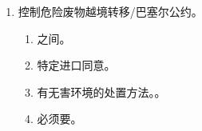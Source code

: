 \begin{enumerate}
\begin{enumerate}
\begin{kk}{以清单为基础的许可证制度}
\begin{enumerate}
                    \item 附件三。自行决定管理。
                    \item 活体和标本。
                  \end{enumerate}
                \end{kk}
          \item 控制危险废物越境转移/巴塞尔公约。
                \begin{enumerate}
                  \item {}之间。
                  \item 特定进口同意。
                  \item 有无害环境的处置方法。。
                  \item 必须要。
                \end{enumerate}
        \end{enumerate}
\end{enumerate}
